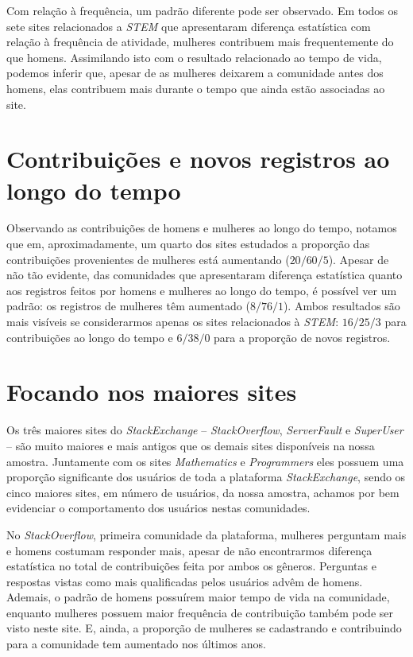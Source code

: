 Com relação à frequência, um padrão diferente pode ser observado. Em todos os sete sites relacionados a \emph{STEM} que apresentaram diferença estatística com relação à frequência de atividade, mulheres contribuem mais frequentemente do que homens. Assimilando isto com o resultado relacionado ao tempo de vida, podemos inferir que, apesar de as mulheres deixarem a comunidade antes dos homens, elas contribuem mais durante o tempo que ainda estão associadas ao site.


\section{Contribuições e novos registros ao longo do tempo}
Observando as contribuições de homens e mulheres ao longo do tempo, notamos que em, aproximadamente, um quarto dos sites estudados a proporção das contribuições provenientes de mulheres está aumentando ($20/60/5$). Apesar de não tão evidente, das comunidades que apresentaram diferença estatística quanto aos registros feitos por homens e mulheres ao longo do tempo, é possível ver um padrão: os registros de mulheres têm aumentado ($8/76/1$). Ambos resultados são mais visíveis se considerarmos apenas os sites relacionados à \emph{STEM}: $16/25/3$ para contribuições ao longo do tempo e $6/38/0$ para a proporção de novos registros.

\section{Focando nos maiores sites} 

Os três maiores sites do \emph{StackExchange} -- \emph{StackOverflow}, \emph{ServerFault} e \emph{SuperUser} -- são muito maiores e mais antigos que os demais sites disponíveis na nossa amostra. Juntamente com os sites \emph{Mathematics} e \emph{Programmers} eles possuem uma proporção significante dos usuários de toda a plataforma \emph{StackExchange}, sendo os cinco maiores sites, em número de usuários, da nossa amostra, achamos por bem evidenciar o comportamento dos usuários nestas comunidades. 

No \emph{StackOverflow}, primeira comunidade da plataforma, mulheres perguntam mais e homens costumam responder mais, apesar de não encontrarmos diferença estatística no total de contribuições feita por ambos os gêneros. Perguntas e respostas vistas como mais qualificadas pelos usuários advêm de homens. Ademais, o padrão de homens possuírem maior tempo de vida na comunidade, enquanto mulheres possuem maior frequência de contribuição também pode ser visto neste site. E, ainda, a proporção de mulheres se cadastrando e contribuindo para a comunidade tem aumentado nos últimos anos.

